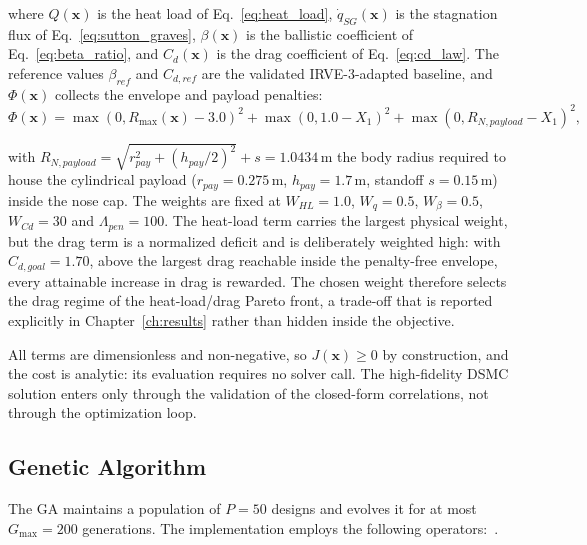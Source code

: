 \noindent where $Q(\mathbf{x})$ is the heat load of Eq.~\eqref{eq:heat_load}, $\dot{q}_{SG}(\mathbf{x})$ is the stagnation flux of Eq.~\eqref{eq:sutton_graves}, $\beta(\mathbf{x})$ is the ballistic coefficient of Eq.~\eqref{eq:beta_ratio}, and $C_d(\mathbf{x})$ is the drag coefficient of Eq.~\eqref{eq:cd_law}. The reference values $\beta_{ref}$ and $C_{d,ref}$ are the validated IRVE-3-adapted baseline, and $\Phi(\mathbf{x})$ collects the envelope and payload penalties:
\begin{equation}
    \Phi(\mathbf{x}) = \max(0, R_{\max}(\mathbf{x}) - 3.0)^{2} + \max(0, 1.0 - X_1)^{2} + \max(0, R_{N,payload} - X_1)^{2},
    \label{eq:penalty}
\end{equation}

\noindent with $R_{N,payload}=\sqrt{r_{pay}^2+(h_{pay}/2)^2}+s = 1.0434$\,m the body radius required to house the cylindrical payload ($r_{pay}=0.275$\,m, $h_{pay}=1.7$\,m, standoff $s=0.15$\,m) inside the nose cap. The weights are fixed at $W_{HL} = 1.0$, $W_{q} = 0.5$, $W_{\beta} = 0.5$, $W_{Cd} = 30$ and $\Lambda_{pen} = 100$. The heat-load term carries the largest physical weight, but the drag term is a normalized deficit and is deliberately weighted high: with $C_{d,goal} = 1.70$, above the largest drag reachable inside the penalty-free envelope, every attainable increase in drag is rewarded. The chosen weight therefore selects the drag regime of the heat-load/drag Pareto front, a trade-off that is reported explicitly in Chapter~\ref{ch:results} rather than hidden inside the objective.

All terms are dimensionless and non-negative, so $J(\mathbf{x}) \ge 0$ by construction, and the cost is analytic: its evaluation requires no solver call. The high-fidelity DSMC solution enters only through the validation of the closed-form correlations, not through the optimization loop.

\subsection{Genetic Algorithm}
\label{sec:ga_operators}

The GA maintains a population of $P = 50$ designs and evolves it for at most $G_{\max} = 200$ generations. The implementation employs the following operators:~\cite{Goldberg1989}.

